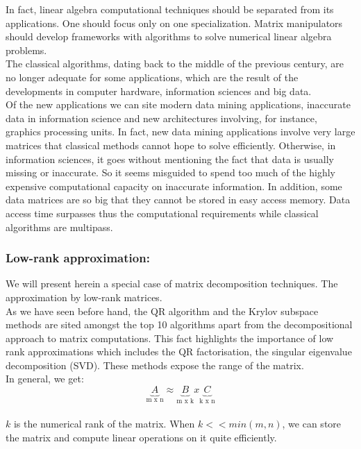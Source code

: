 \documentclass[onecolumn,11pt]{article}
\begin{document}
In fact, linear algebra computational techniques should be separated from its applications. One should focus only on one specialization. Matrix manipulators should develop frameworks with algorithms to solve numerical linear algebra problems.\\


The classical algorithms, dating back to the middle of the previous century, are no longer adequate for some applications, which are the result of the developments in computer hardware, information sciences and big data.\\


Of the new applications we can site modern data mining applications, inaccurate data in information science and new architectures involving, for instance, graphics processing units. In fact, new data mining applications involve very large matrices that classical methods cannot hope to solve efficiently. Otherwise, in information sciences, it goes without mentioning the fact that data is usually missing or inaccurate. So it seems misguided to spend too much of the highly expensive computational capacity on inaccurate information. In addition, some data matrices are so big that they cannot be stored in easy access memory. Data access time surpasses thus the computational requirements while classical algorithms are multipass.\\

\subsubsection{Low-rank approximation:}

We will present herein a special case of matrix decomposition techniques. The approximation by low-rank matrices.\\

As we have seen before hand, the QR algorithm and the Krylov subspace methods are sited amongst the top 10 algorithms apart from the decompositional approach to matrix computations. This fact highlights the importance of low rank approximations which includes the QR factorisation, the singular eigenvalue decomposition (SVD). These methods expose the range of the matrix.\\

In general, we get:
$$ \underbrace{A}_\textrm{m x n}\approx  \underbrace{B}_\textrm{m x k} x \underbrace{C}_\textrm{k x n}$$
\\

$k$ is the numerical rank of the matrix. When $k<<min(m,n)$, we can store the matrix and compute linear operations on it quite efficiently.\\
\end{document}

